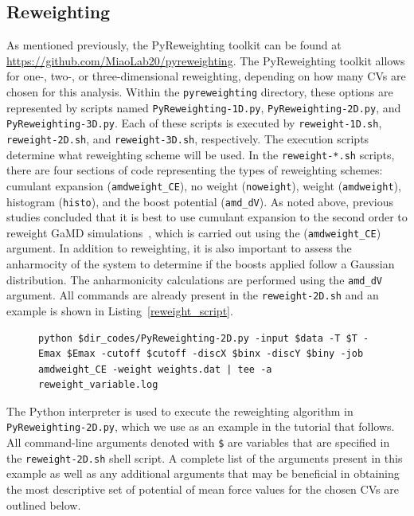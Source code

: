 \documentclass[9pt,tutorial]{livecoms}
\begin{document}
\subsection{Reweighting}
\label{ss:reweight}
As mentioned previously, the PyReweighting toolkit can be found at \url{https://github.com/MiaoLab20/pyreweighting}. The PyReweighting toolkit allows for one-, two-, or three-dimensional reweighting, depending on how many CVs are chosen for this analysis. Within the \texttt{pyreweighting} directory, these options are represented by scripts named \texttt{PyReweighting-1D.py}, \texttt{PyReweighting-2D.py}, and \texttt{PyReweighting-3D.py}. Each of these scripts is executed by \texttt{reweight-1D.sh}, \texttt{reweight-2D.sh}, and \texttt{reweight-3D.sh}, respectively. The execution scripts determine what reweighting scheme will be used. In the \texttt{reweight-*.sh} scripts, there are four sections of code representing the types of reweighting schemes: cumulant expansion (\texttt{amdweight\_CE}), no weight (\texttt{noweight}), weight (\texttt{amdweight}), histogram (\texttt{histo}), and the boost potential (\texttt{amd\_dV}). As noted above, previous studies concluded that it is best to use cumulant expansion to the second order to reweight GaMD simulations~\cite{shen_statistical_2008, miao_improved_2014}, which is carried out using the (\texttt{amdweight\_CE}) argument. In addition to reweighting, it is also important to assess the anharmocity of the system to determine if the boosts applied follow a Gaussian distribution. The anharmonicity calculations are performed using the \texttt{amd\_dV} argument. All commands are already present in the \texttt{reweight-2D.sh} and an example is shown in Listing~\ref{reweight_script}.

\begin{figure}[hbt]
\begin{lstlisting}[label=reweight_script,caption=reweight-2D.sh, basicstyle=\small,breaklines=true, backgroundcolor=\color{light-gray}]
python $dir_codes/PyReweighting-2D.py -input $data -T $T -Emax $Emax -cutoff $cutoff -discX $binx -discY $biny -job amdweight_CE -weight weights.dat | tee -a reweight_variable.log
\end{lstlisting}
\end{figure}

The Python interpreter is used to execute the reweighting algorithm in \texttt{PyReweighting-2D.py}, which we use as an example in the tutorial that follows. All command-line arguments denoted with \texttt{\$} are variables that are specified in the \texttt{reweight-2D.sh} shell script. A complete list of the arguments present in this example as well as any additional arguments that may be beneficial in obtaining the most descriptive set of potential of mean force values for the chosen CVs are outlined below.
\end{document}
